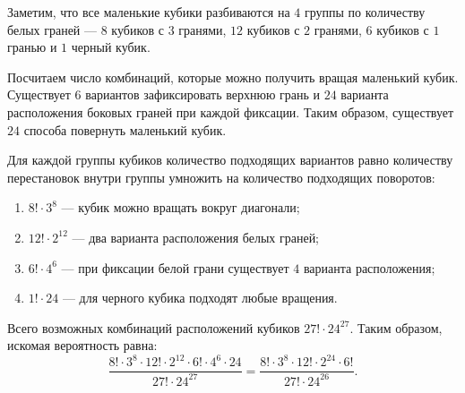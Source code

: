 \documentclass{article}
\begin{document}
Заметим, что все маленькие кубики разбиваются на $4$ группы по количеству белых граней --- $8$ кубиков с $3$ гранями, $12$ кубиков с $2$ гранями, $6$ кубиков с $1$ гранью и $1$ черный кубик.

Посчитаем число комбинаций, которые можно получить вращая маленький кубик. Существует $6$ вариантов зафиксировать верхнюю грань и $24$ варианта расположения боковых граней при каждой фиксации. Таким образом, существует $24$ способа повернуть маленький кубик. 

Для каждой группы кубиков количество подходящих вариантов равно количеству перестановок внутри группы умножить на количество подходящих поворотов:
\begin{enumerate}
\item $8!\cdot 3^8$ --- кубик можно вращать вокруг диагонали;
\item $12!\cdot 2^{12}$ --- два варианта расположения белых граней;
\item $6!\cdot 4^6$ --- при фиксации белой грани существует $4$ варианта расположения;
\item $1! \cdot 24$ --- для черного кубика подходят любые вращения.
\end{enumerate}
Всего возможных комбинаций расположений кубиков $27! \cdot{24}^{27}$.
Таким образом, искомая вероятность равна: $$\frac{8!\cdot 3^8 \cdot 12!\cdot 2^{12} \cdot 6! \cdot 4^6 \cdot 24}{27! \cdot{24}^{27}} = \frac{8!\cdot 3^8 \cdot 12!\cdot 2^{24} \cdot 6!}{27! \cdot{24}^{26}}.$$
\end{document}
